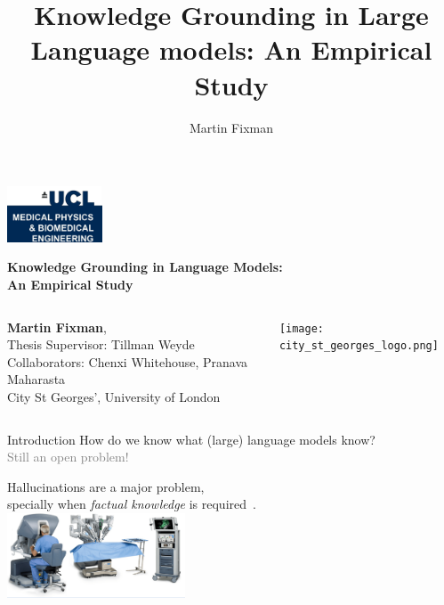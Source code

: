 \documentclass[10pt]{beamer}
\title{Knowledge Grounding in Large Language models: An Empirical Study}
\author{Martin Fixman}
\begin{document}
	
\begin{frame}{}
	\raggedleft
	\includegraphics[width=80pt]{ucl_medical_logo}

	\vfill{}

	\centering
	{
		\Large\bfseries
		Knowledge Grounding in Language Models: \\ An Empirical Study	
	}

	\vfill{}

	\begin{columns}[c]
		{\large \textbf{Martin Fixman}}, \\
		Thesis Supervisor: Tillman Weyde \\
		Collaborators: Chenxi Whitehouse, Pranava Maharasta \\[1em]
		City St Georges', University of London

		\texttt{[image: city\_st\_georges\_logo.png]}
	\end{columns}
\end{frame}

\begin{frame}{Introduction}
	How do we know what (large) language models know? \\
	\pause{}
	\textcolor{gray}{Still an open problem!}

	\vfill{}

	Hallucinations are a major problem, \\ specially when \emph{factual knowledge} is required~. \\[1em]
	\centering
	\includegraphics[width=150pt]{robotic_surgery_2.png}
\end{frame}
\end{document}
